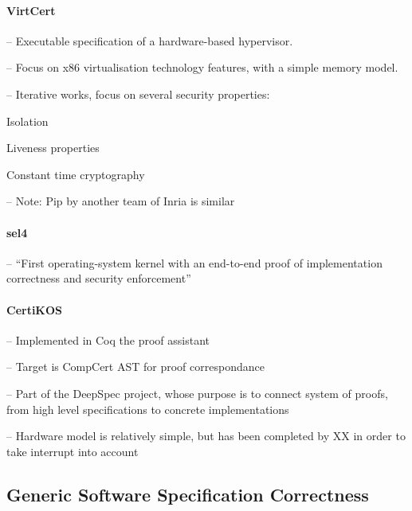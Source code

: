 \paragraph{VirtCert}
%
\begin{compactitem}
\item[--] Executable specification of a hardware-based hypervisor.
%
\item[--] Focus on x86 virtualisation technology features, with a simple memory
  model.
\item[--] Iterative works, focus on several security properties:
  \begin{compactitem}
  \item Isolation
  \item Liveness properties
  \item Constant time cryptography
  \end{compactitem}
\item[--] Note: Pip by another team of Inria is similar
\end{compactitem}

\paragraph{sel4}
%
\begin{compactitem}
\item[--] ``First operating-system kernel with an end-to-end proof of
  implementation correctness and security enforcement''
\end{compactitem}

\paragraph{CertiKOS}
%
\begin{compactitem}
\item[--] Implemented in Coq the proof assistant
\item[--] Target is CompCert AST for proof correspondance
\item[--] Part of the DeepSpec project, whose purpose is to connect system of
  proofs, from high level specifications to concrete implementations
\item[--] Hardware model is relatively simple, but has been completed by XX in
  order to take interrupt into account
\end{compactitem}

\subsection{Generic Software Specification Correctness}

